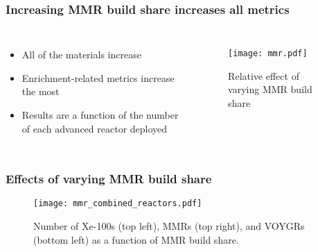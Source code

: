 \begin{frame}
    \frametitle{Increasing MMR build share increases all metrics}
    \begin{columns}

        \column[t]{4.5cm}
        \begin{itemize}
            \item All of the materials increase
            \item Enrichment-related metrics increase the most
            \item<2-> Results are a function of the number of
                  each advanced reactor deployed
        \end{itemize}

    \column[t]{5.5cm}
    \vspace{-0.5cm}
    \begin{figure}
        \centering 
            \texttt{[image: mmr.pdf]}
            \caption{Relative effect of varying MMR build share}
            \label{fig:mmr_effects}
    \end{figure}

\end{columns}
\end{frame}

\begin{frame}
    \frametitle{Effects of varying MMR build share}
    \begin{figure}
        \centering
        \texttt{[image: mmr\_combined\_reactors.pdf]}
        \caption{Number of Xe-100s (top left), MMRs (top right), and VOYGRs
        (bottom left) as a function of MMR build share.}
        \label{fig:mmr_s7_combined_reactors}
    \end{figure}
\end{frame}

